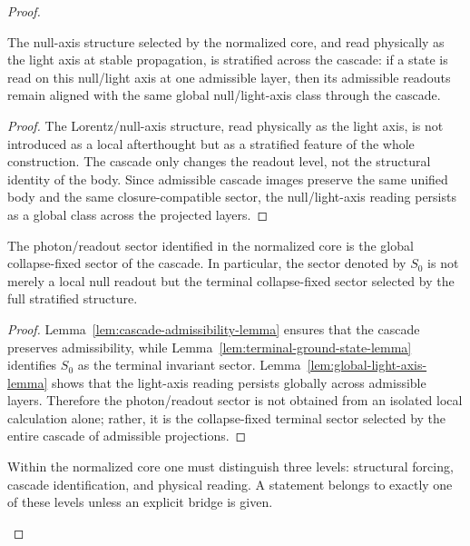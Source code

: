 \begin{proof}
\begin{lemma}
\label{lem:global-light-axis-lemma}
The null-axis structure selected by the normalized core, and read physically as the light axis at stable propagation, is stratified across
the cascade: if a state is read on this null/light axis at one admissible layer, then
its admissible readouts remain aligned with the same global null/light-axis class
through the cascade.
\end{lemma}

\begin{proof}
The Lorentz/null-axis structure, read physically as the light axis, is not introduced as a local afterthought but
as a stratified feature of the whole construction. The cascade only changes the
readout level, not the structural identity of the body. Since admissible
cascade images preserve the same unified body and the same closure-compatible
sector, the null/light-axis reading persists as a global class across the projected
layers.
\end{proof}

\begin{theorem}
\label{thm:collapse-fixed-sector-theorem}
The photon/readout sector identified in the normalized core is the global
collapse-fixed sector of the cascade. In particular, the sector denoted by
$S_0$ is not merely a local null readout but the terminal collapse-fixed sector
selected by the full stratified structure.
\end{theorem}

\begin{proof}
Lemma~\ref{lem:cascade-admissibility-lemma} ensures that the cascade preserves
admissibility, while Lemma~\ref{lem:terminal-ground-state-lemma} identifies
$S_0$ as the terminal invariant sector. Lemma~\ref{lem:global-light-axis-lemma}
shows that the light-axis reading persists globally across admissible layers.
Therefore the photon/readout sector is not obtained from an isolated local
calculation alone; rather, it is the collapse-fixed terminal sector selected by
the entire cascade of admissible projections.
\end{proof}

\begin{lemma}
\label{lem:readout-separation-lemma}
Within the normalized core one must distinguish three levels: structural
forcing, cascade identification, and physical reading. A statement belongs to
exactly one of these levels unless an explicit bridge is given.
\end{lemma}


\end{proof}
